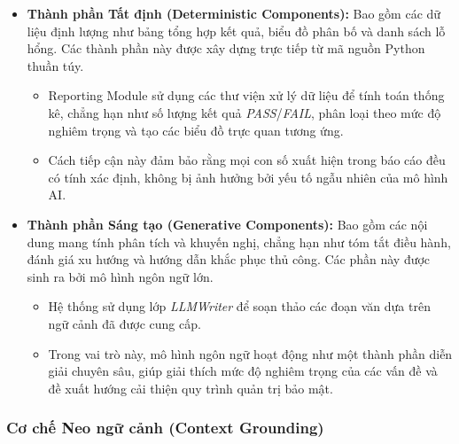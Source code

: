 \begin{itemize}
  \item \textbf{Thành phần Tất định (Deterministic Components):}
    Bao gồm các dữ liệu định lượng
    như bảng tổng hợp kết quả,
    biểu đồ phân bố
    và danh sách lỗ hổng.
    Các thành phần này
    được xây dựng
    trực tiếp
    từ mã nguồn Python thuần túy.

    \begin{itemize}
      \item Reporting Module
        sử dụng các thư viện
        xử lý dữ liệu
        để tính toán thống kê,
        chẳng hạn như
        số lượng kết quả
        \textit{PASS}/\textit{FAIL},
        phân loại
        theo mức độ nghiêm trọng
        và tạo
        các biểu đồ trực quan
        tương ứng.

      \item Cách tiếp cận này
        đảm bảo rằng
        mọi con số
        xuất hiện trong báo cáo
        đều có tính xác định,
        không bị ảnh hưởng
        bởi yếu tố ngẫu nhiên
        của mô hình AI.
    \end{itemize}

  \item \textbf{Thành phần Sáng tạo (Generative Components):}
    Bao gồm các nội dung
    mang tính phân tích
    và khuyến nghị,
    chẳng hạn như
    tóm tắt điều hành,
    đánh giá xu hướng
    và hướng dẫn
    khắc phục thủ công.
    Các phần này
    được sinh ra
    bởi mô hình ngôn ngữ lớn.

    \begin{itemize}
      \item Hệ thống
        sử dụng lớp
        \textit{LLMWriter}
        để soạn thảo
        các đoạn văn
        dựa trên
        ngữ cảnh đã được cung cấp.

      \item Trong vai trò này,
        mô hình ngôn ngữ
        hoạt động
        như một thành phần
        diễn giải chuyên sâu,
        giúp giải thích
        mức độ nghiêm trọng
        của các vấn đề
        và đề xuất
        hướng cải thiện
        quy trình quản trị bảo mật.
    \end{itemize}
\end{itemize}

\subsubsection*{Cơ chế Neo ngữ cảnh (Context Grounding)}

